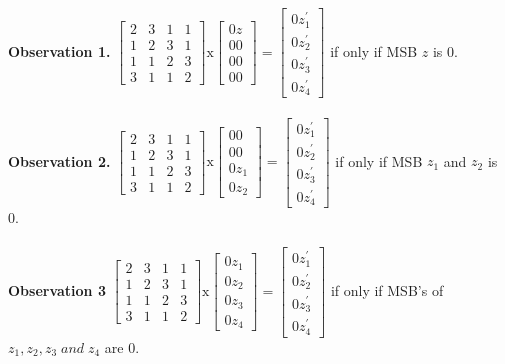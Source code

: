 \begin{frame}
    \textbf{Observation 1.} 
\begin{math}
\begin{bmatrix}
2&3&1&1\\
1&2&3&1\\
1&1&2&3\\
3&1&1&2
\end{bmatrix}
\text{x}
\begin{bmatrix}
0z \\
00 \\
00 \\
00 
\end{bmatrix} = 
\begin{bmatrix}
0z^{'}_{1} \\
0z^{'}_{2} \\
0z^{'}_{3} \\
0z^{'}_{4} 
\end{bmatrix}
\end{math} if only if MSB $z$ is 0. \\ \\
\textbf{Observation 2.} 
\begin{math}
\begin{bmatrix}
2&3&1&1\\
1&2&3&1\\
1&1&2&3\\
3&1&1&2
\end{bmatrix}
\text{x}
\begin{bmatrix}
00 \\
00 \\
0z_{1} \\
0z_{2} 
\end{bmatrix} = 
\begin{bmatrix}
0z^{'}_{1} \\
0z^{'}_{2} \\
0z^{'}_{3} \\
0z^{'}_{4} 
\end{bmatrix}
\end{math} if only if MSB $z_{1}$ and $z_{2}$ is 0. \\ \\
\textbf{Observation 3}
\begin{math}
\begin{bmatrix}
2&3&1&1\\
1&2&3&1\\
1&1&2&3\\
3&1&1&2
\end{bmatrix}
\text{x}
\begin{bmatrix}
0z_{1} \\
0z_{2} \\
0z_{3} \\
0z_{4} 
\end{bmatrix} = 
\begin{bmatrix}
0z^{'}_{1} \\
0z^{'}_{2} \\
0z^{'}_{3} \\
0z^{'}_{4} 
\end{bmatrix}
\end{math}
 if only if MSB's of $z_{1},
z_{2} ,
z_{3} \;and\;
z_{4} $ are 0.\\
\end{frame}
